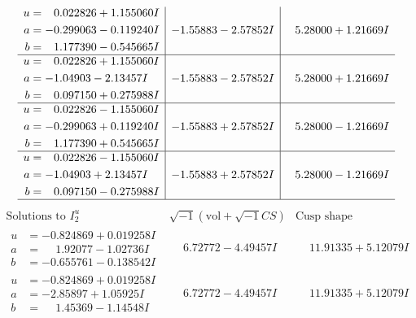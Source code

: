 \documentclass[1p]{elsarticle_modified}
\theoremstyle{definition}
\newcommand{\I}{\sqrt{-1}}
\begin{document}
$$\begin{array}{c|c|c}
\begin{aligned}
u &= \phantom{-}0.022826 + 1.155060 I \\
a &= -0.299063 - 0.119240 I \\
b &= \phantom{-}1.177390 - 0.545665 I\end{aligned}
 & -1.55883 - 2.57852 I & \phantom{-}5.28000 + 1.21669 I \\ \hline\begin{aligned}
u &= \phantom{-}0.022826 + 1.155060 I \\
a &= -1.04903 - 2.13457 I \\
b &= \phantom{-}0.097150 + 0.275988 I\end{aligned}
 & -1.55883 - 2.57852 I & \phantom{-}5.28000 + 1.21669 I \\ \hline\begin{aligned}
u &= \phantom{-}0.022826 - 1.155060 I \\
a &= -0.299063 + 0.119240 I \\
b &= \phantom{-}1.177390 + 0.545665 I\end{aligned}
 & -1.55883 + 2.57852 I & \phantom{-}5.28000 - 1.21669 I \\ \hline\begin{aligned}
u &= \phantom{-}0.022826 - 1.155060 I \\
a &= -1.04903 + 2.13457 I \\
b &= \phantom{-}0.097150 - 0.275988 I\end{aligned}
 & -1.55883 + 2.57852 I & \phantom{-}5.28000 - 1.21669 I\\
 \hline 
 \end{array}$$\newpage$$\begin{array}{c|c|c}  
\text{Solutions to }I^u_{2}& \I (\text{vol} + \sqrt{-1}CS) & \text{Cusp shape}\\
 \hline 
\begin{aligned}
u &= -0.824869 + 0.019258 I \\
a &= \phantom{-}1.92077 - 1.02736 I \\
b &= -0.655761 - 0.138542 I\end{aligned}
 & \phantom{-}6.72772 - 4.49457 I & \phantom{-}11.91335 + 5.12079 I \\ \hline\begin{aligned}
u &= -0.824869 + 0.019258 I \\
a &= -2.85897 + 1.05925 I \\
b &= \phantom{-}1.45369 - 1.14548 I\end{aligned}
 & \phantom{-}6.72772 - 4.49457 I & \phantom{-}11.91335 + 5.12079 I \\ \hline\begin{aligned}

\end{aligned}
\end{array}$$
\end{document}
